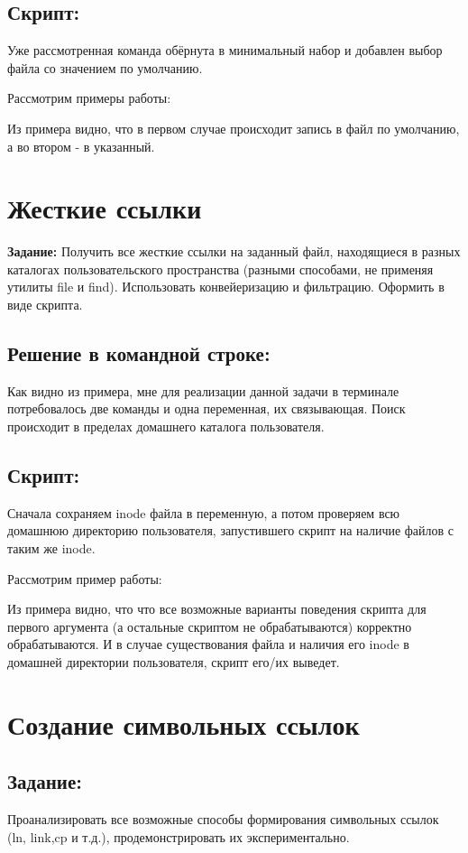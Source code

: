 \documentclass[a4paper]{article}
\begin{document}
\subsection{Скрипт:}

Уже рассмотренная команда обёрнута в минимальный набор и добавлен выбор файла со значением по умолчанию.

Рассмотрим примеры работы:

Из примера видно, что в первом случае происходит запись в файл по умолчанию, а во втором - в указанный.
\section{Жесткие ссылки} \textbf{Задание:} Получить все жесткие ссылки на заданный файл, находящиеся в разных каталогах пользовательского пространства (разными способами, не применяя утилиты file и find). Использовать конвейеризацию и фильтрацию. Оформить в виде скрипта. 

\subsection{Решение в командной строке:}

Как видно из примера, мне для реализации данной задачи в терминале потребовалось две команды и одна переменная, их связывающая. Поиск происходит в пределах домашнего каталога пользователя.

\subsection{Скрипт:}

Сначала сохраняем inode файла в переменную, а потом проверяем всю домашнюю директорию пользователя, запустившего скрипт на наличие файлов с таким же inode.

Рассмотрим пример работы:

Из примера видно, что что все возможные варианты поведения скрипта для первого аргумента (а остальные скриптом не обрабатываются) корректно обрабатываются. И в случае существования файла и наличия его inode в домашней директории пользователя, скрипт его/их выведет.
\section{Создание символьных ссылок}
\subsection{Задание:} Проанализировать все возможные способы формирования символьных ссылок (ln, link,cp и т.д.), продемонстрировать их экспериментально.
\end{document}
